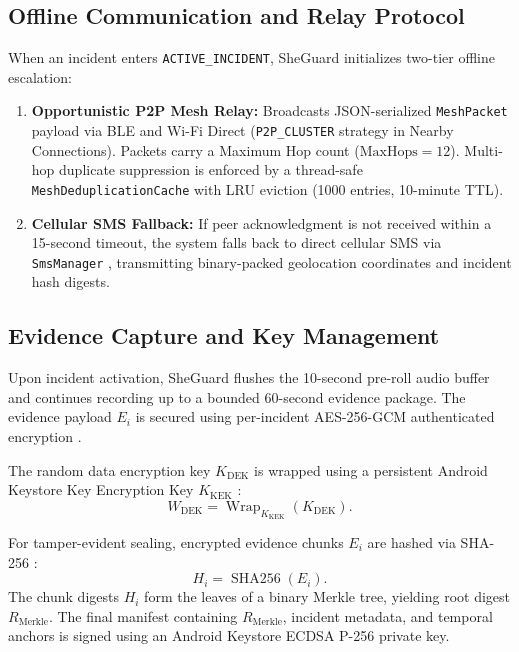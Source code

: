 \documentclass[conference]{IEEEtran}
\begin{document}
\subsection{Offline Communication and Relay Protocol}
When an incident enters \texttt{ACTIVE\_INCIDENT}, SheGuard initializes two-tier offline escalation:
\begin{enumerate}
    \item \textbf{Opportunistic P2P Mesh Relay:} Broadcasts JSON-serialized \texttt{MeshPacket} payload via BLE and Wi-Fi Direct (\texttt{P2P\_CLUSTER} strategy in Nearby Connections). Packets carry a Maximum Hop count ($\text{MaxHops} = 12$). Multi-hop duplicate suppression is enforced by a thread-safe \texttt{MeshDeduplicationCache} with LRU eviction (1000 entries, 10-minute TTL).
    \item \textbf{Cellular SMS Fallback:} If peer acknowledgment is not received within a 15-second timeout, the system falls back to direct cellular SMS via \texttt{SmsManager} \cite{android_sms}, transmitting binary-packed geolocation coordinates and incident hash digests.
\end{enumerate}

\subsection{Evidence Capture and Key Management}
Upon incident activation, SheGuard flushes the 10-second pre-roll audio buffer and continues recording up to a bounded 60-second evidence package. The evidence payload $E_i$ is secured using per-incident AES-256-GCM authenticated encryption \cite{nist_gcm}.

The random data encryption key $K_{\mathrm{DEK}}$ is wrapped using a persistent Android Keystore Key Encryption Key $K_{\mathrm{KEK}}$ \cite{nist_keywrap}:
\begin{equation}
W_{\mathrm{DEK}} = \operatorname{Wrap}_{K_{\mathrm{KEK}}}(K_{\mathrm{DEK}}).
\label{eq:keywrap}
\end{equation}

For tamper-evident sealing, encrypted evidence chunks $E_i$ are hashed via SHA-256 \cite{fips_shs}:
\begin{equation}
H_i = \operatorname{SHA256}(E_i).
\label{eq:hash}
\end{equation}
The chunk digests $H_i$ form the leaves of a binary Merkle tree, yielding root digest $R_{\mathrm{Merkle}}$. The final manifest containing $R_{\mathrm{Merkle}}$, incident metadata, and temporal anchors is signed using an Android Keystore ECDSA P-256 private key.
\end{document}
